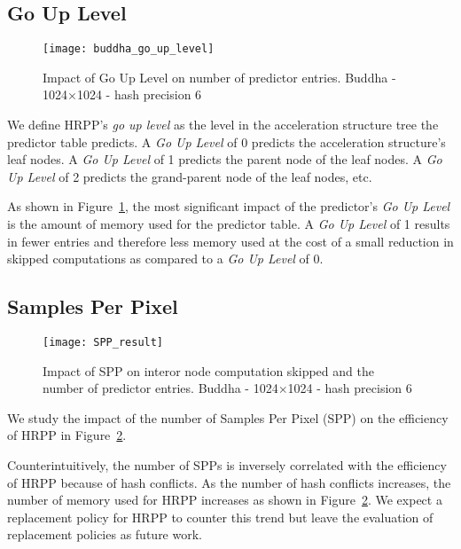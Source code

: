 \subsection{Go Up Level}

\begin{figure}[h]
  \centering
  \texttt{[image: buddha\_go\_up\_level]}
 
  \caption{\label{fig:buddha_up} Impact of Go Up Level on number of predictor entries. Buddha - 1024$\times$1024 - hash precision 6 }
\end{figure}


We define HRPP's \textit{go up level} as the level in the acceleration structure tree the predictor table predicts. 
A \textit{Go Up Level} of 0 predicts the acceleration structure's leaf nodes. A \textit{Go Up Level} of 1 predicts the parent node of the leaf nodes. A \textit{Go Up Level} of 2 predicts the grand-parent node of the leaf nodes, etc.

As shown in Figure~\ref{fig:buddha_up}, the most significant impact of the predictor's \textit{Go Up Level} is the amount of memory used for the predictor table. A \textit{Go Up Level} of 1 results in fewer entries and therefore less memory used at the cost of a small reduction in skipped computations as compared to a \textit{Go Up Level} of 0.


\subsection{Samples Per Pixel}

\begin{figure}[h]
  \centering
  \texttt{[image: SPP\_result]}
 
  \caption{\label{fig:spp_result} Impact of SPP on interor node computation skipped and the number of predictor entries. Buddha - 1024$\times$1024 - hash precision 6}
\end{figure}

We study the impact of the number of Samples Per Pixel (SPP) on the efficiency of HRPP in Figure~\ref{fig:spp_result}. 

Counterintuitively, the number of SPPs is inversely correlated with the efficiency of HRPP because of hash conflicts. As the number of hash conflicts increases, the number of memory used for HRPP increases as shown in Figure~\ref{fig:spp_result}. We expect a replacement policy for HRPP to counter this trend but leave the evaluation of replacement policies as future work.